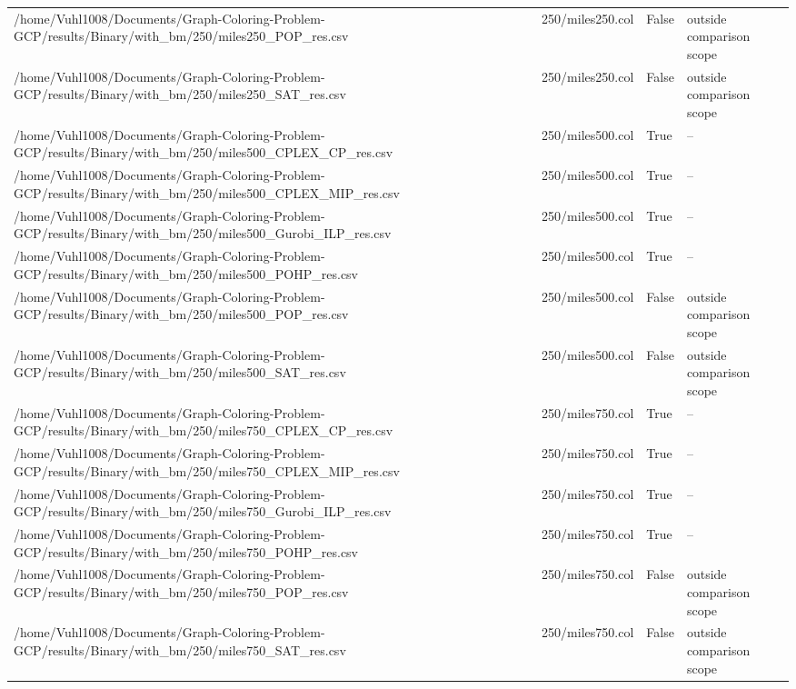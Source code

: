 \begin{table}[htbp]
\begin{tabular}{llll}
/home/Vuhl1008/Documents/Graph-Coloring-Problem-GCP/results/Binary/with\_bm/250/miles250\_POP\_res.csv & 250/miles250.col & False & outside comparison scope \\
/home/Vuhl1008/Documents/Graph-Coloring-Problem-GCP/results/Binary/with\_bm/250/miles250\_SAT\_res.csv & 250/miles250.col & False & outside comparison scope \\
/home/Vuhl1008/Documents/Graph-Coloring-Problem-GCP/results/Binary/with\_bm/250/miles500\_CPLEX\_CP\_res.csv & 250/miles500.col & True & -- \\
/home/Vuhl1008/Documents/Graph-Coloring-Problem-GCP/results/Binary/with\_bm/250/miles500\_CPLEX\_MIP\_res.csv & 250/miles500.col & True & -- \\
/home/Vuhl1008/Documents/Graph-Coloring-Problem-GCP/results/Binary/with\_bm/250/miles500\_Gurobi\_ILP\_res.csv & 250/miles500.col & True & -- \\
/home/Vuhl1008/Documents/Graph-Coloring-Problem-GCP/results/Binary/with\_bm/250/miles500\_POHP\_res.csv & 250/miles500.col & True & -- \\
/home/Vuhl1008/Documents/Graph-Coloring-Problem-GCP/results/Binary/with\_bm/250/miles500\_POP\_res.csv & 250/miles500.col & False & outside comparison scope \\
/home/Vuhl1008/Documents/Graph-Coloring-Problem-GCP/results/Binary/with\_bm/250/miles500\_SAT\_res.csv & 250/miles500.col & False & outside comparison scope \\
/home/Vuhl1008/Documents/Graph-Coloring-Problem-GCP/results/Binary/with\_bm/250/miles750\_CPLEX\_CP\_res.csv & 250/miles750.col & True & -- \\
/home/Vuhl1008/Documents/Graph-Coloring-Problem-GCP/results/Binary/with\_bm/250/miles750\_CPLEX\_MIP\_res.csv & 250/miles750.col & True & -- \\
/home/Vuhl1008/Documents/Graph-Coloring-Problem-GCP/results/Binary/with\_bm/250/miles750\_Gurobi\_ILP\_res.csv & 250/miles750.col & True & -- \\
/home/Vuhl1008/Documents/Graph-Coloring-Problem-GCP/results/Binary/with\_bm/250/miles750\_POHP\_res.csv & 250/miles750.col & True & -- \\
/home/Vuhl1008/Documents/Graph-Coloring-Problem-GCP/results/Binary/with\_bm/250/miles750\_POP\_res.csv & 250/miles750.col & False & outside comparison scope \\
/home/Vuhl1008/Documents/Graph-Coloring-Problem-GCP/results/Binary/with\_bm/250/miles750\_SAT\_res.csv & 250/miles750.col & False & outside comparison scope \\

\end{tabular}
\end{table}
